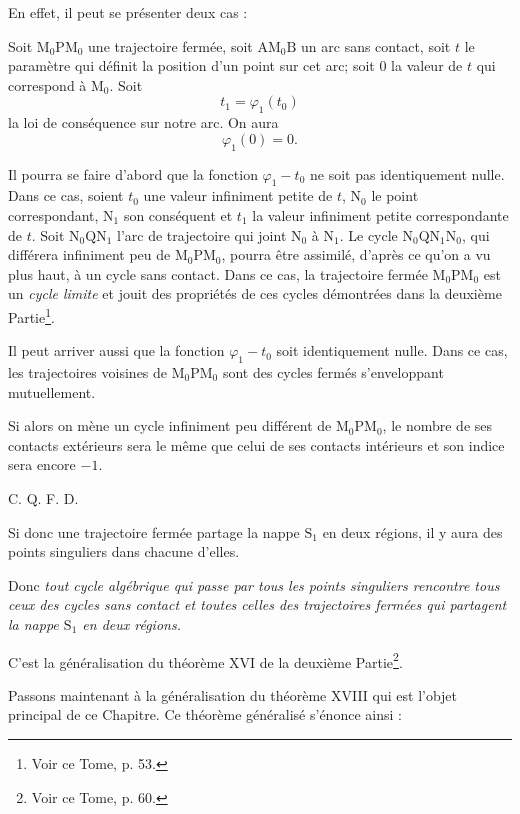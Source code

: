 \documentclass[11pt]{article}
\begin{document}
En effet, il peut se présenter deux cas :

Soit $\mathrm{M}_0\mathrm{P}\mathrm{M}_0$ une trajectoire fermée, soit $\mathrm{A}\mathrm{M}_0\mathrm{B}$ un arc sans contact, soit $t$ le paramètre qui définit la position d’un point sur cet arc; soit 0 la valeur de $t$ qui correspond à $\mathrm{M}_0$. Soit
\[
t_1=\varphi_1(t_0)
\]
la loi de conséquence sur notre arc. On aura
\[
\varphi_1(0)=0.
\]

Il pourra se faire d’abord que la fonction $\varphi_1-t_0$ ne soit pas identiquement nulle. Dans ce cas, soient $t_0$ une valeur infiniment petite de $t$, $\mathrm{N}_0$ le point correspondant, $\mathrm{N}_1$ son conséquent et $t_1$ la valeur infiniment petite correspondante de $t$. Soit $\mathrm{N}_0\mathrm{Q}\mathrm{N}_1$ l’arc de trajectoire qui joint $\mathrm{N}_0$ à $\mathrm{N}_1$. Le cycle $\mathrm{N}_0\mathrm{Q}\mathrm{N}_1\mathrm{N}_0$, qui différera infiniment peu de $\mathrm{M}_0\mathrm{P}\mathrm{M}_0$, pourra être assimilé, d’après ce qu’on a vu plus haut, à un cycle sans contact. Dans ce cas, la trajectoire fermée $\mathrm{M}_0\mathrm{P}\mathrm{M}_0$ est un \emph{cycle limite} et jouit des propriétés de ces cycles démontrées dans la deuxième Partie\footnote{Voir ce Tome, p. 53.}.

Il peut arriver aussi que la fonction $\varphi_1-t_0$ soit identiquement nulle. Dans ce cas, les trajectoires voisines de $\mathrm{M}_0\mathrm{P}\mathrm{M}_0$ sont des cycles fermés s’enveloppant mutuellement.

Si alors on mène un cycle infiniment peu différent de $\mathrm{M}_0\mathrm{P}\mathrm{M}_0$, le nombre de ses contacts extérieurs sera le même que celui de ses contacts intérieurs et son indice sera encore $-1$.
\begin{flushright}C. Q. F. D.\end{flushright}

Si donc une trajectoire fermée partage la nappe $\mathrm{S}_1$ en deux régions, il y aura des points singuliers dans chacune d’elles.

Donc \emph{tout cycle algébrique qui passe par tous les points singuliers rencontre tous ceux des cycles sans contact et toutes celles des trajectoires fermées qui partagent la nappe $\mathrm{S}_1$ en deux régions.}

C’est la généralisation du théorème XVI de la deuxième Partie\footnote{Voir ce Tome, p. 60.}.

Passons maintenant à la généralisation du théorème XVIII qui est l’objet principal de ce Chapitre. Ce théorème généralisé s’énonce ainsi :
\end{document}
